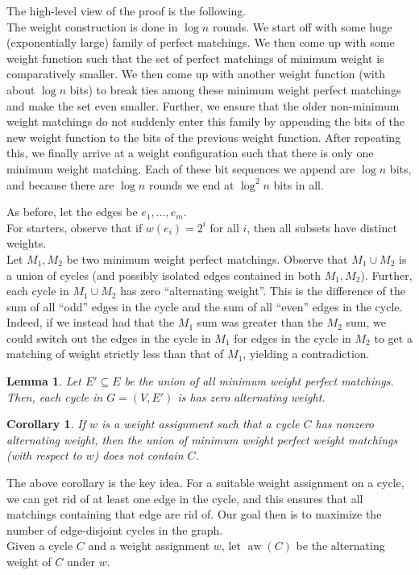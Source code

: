 \documentclass{article}
\newtheorem{lemma}[theorem]{Lemma}
\newtheorem{corollary}[theorem]{Corollary}
\newcommand{\aw}{\operatorname{aw}}
\begin{document}
		The high-level view of the proof is the following.\\
		The weight construction is done in $\log n$ rounds. We start off with some huge (exponentially large) family of perfect matchings. We then come up with some weight function such that the set of perfect matchings of minimum weight is comparatively smaller. We then come up with another weight function (with about $\log n$ bits) to break ties among these minimum weight perfect matchings and make the set even smaller. Further, we ensure that the older non-minimum weight matchings do not suddenly enter this family by appending the bits of the new weight function to the bits of the previous weight function. After repeating this, we finally arrive at a weight configuration such that there is only one minimum weight matching. Each of these bit sequences we append are $\log n$ bits, and because there are $\log n$ rounds we end at $\log^2 n$ bits in all.

		As before, let the edges be $e_1,\ldots,e_m$.\\
		For starters, observe that if $w(e_i) = 2^i$ for all $i$, then all subsets have distinct weights.\\
		Let $M_1,M_2$ be two minimum weight perfect matchings. Observe that $M_1 \cup M_2$ is a union of cycles (and possibly isolated edges contained in both $M_1,M_2$). Further, each cycle in $M_1 \cup M_2$ has zero ``alternating weight''. This is the difference of the sum of all ``odd'' edges in the cycle and the sum of all ``even'' edges in the cycle. Indeed, if we instead had that the $M_1$ sum was greater than the $M_2$ sum, we could switch out the edges in the cycle in $M_1$ for edges in the cycle in $M_2$ to get a matching of weight strictly less than that of $M_1$, yielding a contradiction.

		\begin{lemma}
			\label{lem: union of perfect matchings}
			Let $E' \subseteq E$ be the union of all minimum weight perfect matchings. Then, each cycle in $G = (V,E')$ is has zero alternating weight.
		\end{lemma}
		
		\begin{corollary}
			If $w$ is a weight assignment such that a cycle $C$ has nonzero alternating weight, then the union of minimum weight perfect weight matchings (with respect to $w$) does \emph{not} contain $C$.
		\end{corollary}

		The above corollary is the key idea. For a suitable weight assignment on a cycle, we can get rid of at least one edge in the cycle, and this ensures that all matchings containing that edge are rid of. Our goal then is to maximize the number of edge-disjoint cycles in the graph.\\
		Given a cycle $C$ and a weight assignment $w$, let $\aw(C)$ be the alternating weight of $C$ under $w$.
\end{document}
